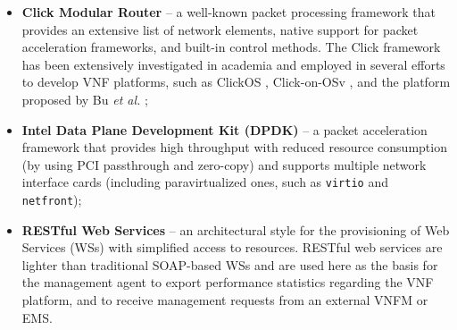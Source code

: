 \begin{itemize}
    \item \textbf{Click Modular Router} -- a well-known packet processing framework that provides an extensive list of network elements, native support for packet acceleration frameworks, and built-in control methods. The Click framework has been extensively investigated in academia and employed in several efforts to develop VNF platforms, such as ClickOS \cite{Martins-2014}, Click-on-OSv \cite{Marcuzzo-2018}, and the platform proposed by Bu \textit{et al.} \cite{Bu-2018}; %


      \item \textbf{Intel Data Plane Development Kit (DPDK)} -- a packet acceleration framework that provides high throughput with reduced resource consumption (by using PCI passthrough and zero-copy) and supports multiple network interface cards (including paravirtualized ones, such as \texttt{virtio} and \texttt{netfront}); %


      \item \textbf{RESTful Web Services} -- an architectural style for the provisioning of Web Services (WSs) with simplified access to resources. RESTful web services are lighter than traditional SOAP-based WSs and are used here as the basis for the management agent to export performance statistics regarding the VNF platform, and to receive management requests from an external VNFM or EMS.


\end{itemize}
